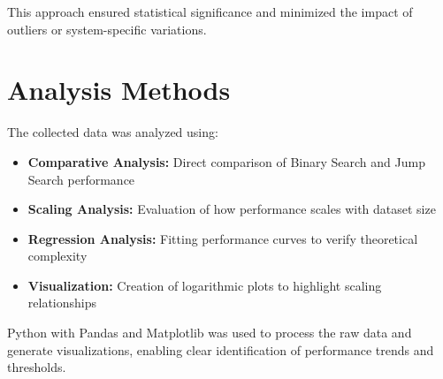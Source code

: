 This approach ensured statistical significance and minimized the impact of outliers or system-specific variations.

\section{Analysis Methods}

The collected data was analyzed using:

\begin{itemize}
    \item \textbf{Comparative Analysis:} Direct comparison of Binary Search and Jump Search performance
    \item \textbf{Scaling Analysis:} Evaluation of how performance scales with dataset size
    \item \textbf{Regression Analysis:} Fitting performance curves to verify theoretical complexity
    \item \textbf{Visualization:} Creation of logarithmic plots to highlight scaling relationships
\end{itemize}

Python with Pandas and Matplotlib was used to process the raw data and generate visualizations, enabling clear identification of performance trends and thresholds.